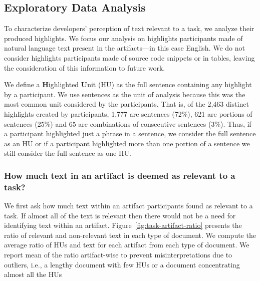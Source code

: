 \subsection{Exploratory Data Analysis}




To characterize developers' perception of text relevant to a task, 
we analyze their produced highlights.
We focus
our analysis on highlights participants made of natural language
text present in the artifacts---in this case English. We do not
consider highlights participants made of source code snippets or in
tables, leaving the consideration of this information to future work.



We define a \textbf{H}ighlighted \textbf{U}nit (HU) as the full sentence containing any
highlight by a participant. 
We use sentences as the unit of analysis 
because this was the most common unit considered by the participants.
That is, of the 2,463
distinct highlights created by participants, 1,777 are sentences
(72\%), 621 are portions of sentences (25\%) and 65 are combinations
of consecutive sentences (3\%). 
Thus, if a participant highlighted just a
phrase in a sentence, we consider the full sentence as an HU or if a
participant highlighted more than one portion of a sentence we still
consider the full sentence as one HU. 


\subsubsection{How much text in an artifact is deemed as relevant to a task?}
\label{cp3:ratio}



We first ask how much text within an artifact participants found as relevant to a task.
If almost all of the text is relevant then there would not be a need for
identifying text within an artifact.
Figure~\ref{fig:task-artifact-ratio} presents the ratio of relevant and non-relevant text in each type of document.
We compute the average ratio of HUs and text for each  artifact from each type of document.
We report mean of the ratio artifact-wise to prevent misinterpretations due to outliers,
i.e., a lengthy document with few HUs or a document concentrating almost all the HUs







